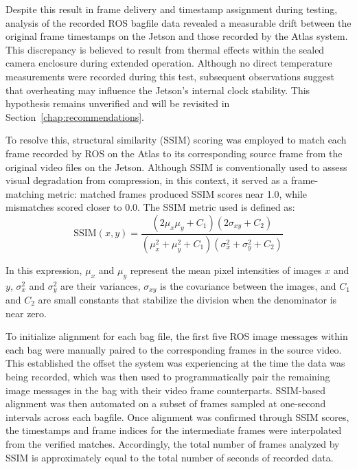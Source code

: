 \documentclass[../main.tex]{subfiles}
\begin{document}
Despite this result in frame delivery and timestamp assignment during testing, analysis of the recorded ROS bagfile data revealed a measurable drift between the original frame timestamps on the Jetson and those recorded by the Atlas system. 
This discrepancy is believed to result from thermal effects within the sealed camera enclosure during extended operation. 
Although no direct temperature measurements were recorded during this test, subsequent observations suggest that overheating may influence the Jetson's internal clock stability. 
This hypothesis remains unverified and will be revisited in Section~\ref{chap:recommendations}.

To resolve this, structural similarity (SSIM) scoring was employed to match each frame recorded by ROS on the Atlas to its corresponding source frame from the original video files on the Jetson. 
Although SSIM is conventionally used to assess visual degradation from compression, in this context, it served as a frame-matching metric: matched frames produced SSIM scores near 1.0, while mismatches scored closer to 0.0. The SSIM metric used is defined as:
\begin{equation}
    \text{SSIM}(x, y) = \frac{(2\mu_x\mu_y + C_1)(2\sigma_{xy} + C_2)}{(\mu_x^2 + \mu_y^2 + C_1)(\sigma_x^2 + \sigma_y^2 + C_2)}
\end{equation}

In this expression, $\mu_x$ and $\mu_y$ represent the mean pixel intensities of images $x$ and $y$, $\sigma_x^2$ and $\sigma_y^2$ are their variances, $\sigma_{xy}$ is the covariance between the images, and $C_1$ and $C_2$ are small constants that stabilize the division when the denominator is near zero.

To initialize alignment for each bag file, the first five ROS image messages within each bag were manually paired to the corresponding frames in the source video.
This established the offset the system was experiencing at the time the data was being recorded, which was then used to programmatically pair the remaining image messages in the bag with their video frame counterparts.
SSIM-based alignment was then automated on a subset of frames sampled at one-second intervals across each bagfile. 
Once alignment was confirmed through SSIM scores, the timestamps and frame indices for the intermediate frames were interpolated from the verified matches. 
Accordingly, the total number of frames analyzed by SSIM is approximately equal to the total number of seconds of recorded data.
\end{document}
